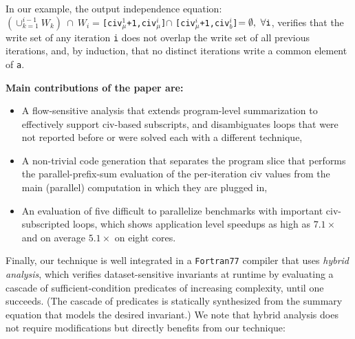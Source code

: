 \documentclass{sig-alternate}
\begin{document}
In our example, the output independence equation:\\
$(\cup_{k=1}^{i-1}W_k)~\cap~W_i = ${\tt [civ$_\mu^1$+1,civ$_\mu^i$]}$\cap$
{\tt [civ$_\mu^i$+1,civ$_b^i$]}$ = \emptyset,~\forall \mbox{\tt{}i}$,
verifies that the write set of any iteration {\tt i} does not overlap
the write set of all previous iterations, and, by induction,
that no distinct iterations write a common element of {\tt a}.



{\bf Main contributions of the paper are:}
\begin{itemize}
    \item A flow-sensitive analysis that extends program-level 
            summarization to effectively support {\sc civ}-based 
            subscripts, 
            and disambiguates loops that were not reported 
            before or were solved each with a different technique,

    \item A non-trivial code generation that separates the 
            program slice that performs the parallel-prefix-sum
            evaluation of the per-iteration {\sc civ} values 
            from the main (parallel) computation in which 
            they are plugged in,

    \item An evaluation of five difficult to parallelize benchmarks 
            with important {\sc civ}-subscripted loops, which
            shows application level speedups as high as 
            $7.1\times$ and on average $5.1\times$ on eight cores.

\end  {itemize}

\enlargethispage{\baselineskip}

Finally, our technique is well integrated %
in a {\tt Fortran77} compiler that uses {\em hybrid analysis}, 
which verifies dataset-sensitive invariants %
at runtime by evaluating a cascade of sufficient-condition 
predicates of increasing complexity, until one succeeds. 
(The cascade of predicates is statically synthesized from the summary 
equation that models the desired invariant.)
%
We note that hybrid analysis does not require modifications
but directly benefits from our technique: 
\end{document}
